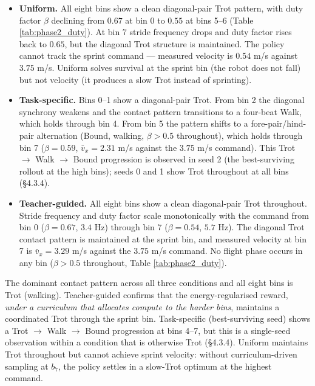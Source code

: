 \begin{itemize}
  \item \textbf{Uniform.} All eight bins show a clean diagonal-pair Trot pattern, with duty factor $\beta$ declining from $0.67$ at bin 0 to $0.55$ at bins 5--6 (Table \ref{tab:phase2_duty}). At bin 7 stride frequency drops and duty factor rises back to $0.65$, but the diagonal Trot structure is maintained. The policy cannot track the sprint command --- measured velocity is $0.54$ m/s against $3.75$ m/s. Uniform solves survival at the sprint bin (the robot does not fall) but not velocity (it produces a slow Trot instead of sprinting).
  \item \textbf{Task-specific.} Bins 0--1 show a diagonal-pair Trot. From bin 2 the diagonal synchrony weakens and the contact pattern transitions to a four-beat Walk, which holds through bin 4. From bin 5 the pattern shifts to a fore-pair/hind-pair alternation (Bound, walking, $\beta > 0.5$ throughout), which holds through bin 7 ($\beta = 0.59$, $\bar v_x = 2.31$ m/s against the $3.75$ m/s command). This Trot $\to$ Walk $\to$ Bound progression is observed in seed 2 (the best-surviving rollout at the high bins); seeds 0 and 1 show Trot throughout at all bins (\S4.3.4).
  \item \textbf{Teacher-guided.} All eight bins show a clean diagonal-pair Trot throughout. Stride frequency and duty factor scale monotonically with the command from bin 0 ($\beta = 0.67$, $3.4$ Hz) through bin 7 ($\beta = 0.54$, $5.7$ Hz). The diagonal Trot contact pattern is maintained at the sprint bin, and measured velocity at bin 7 is $\bar v_x = 3.29$ m/s against the $3.75$ m/s command. No flight phase occurs in any bin ($\beta > 0.5$ throughout, Table \ref{tab:phase2_duty}).
\end{itemize}

The dominant contact pattern across all three conditions and all eight bins is Trot (walking). Teacher-guided confirms that the energy-regularised reward, \textit{under a curriculum that allocates compute to the harder bins}, maintains a coordinated Trot through the sprint bin. Task-specific (best-surviving seed) shows a Trot $\to$ Walk $\to$ Bound progression at bins 4--7, but this is a single-seed observation within a condition that is otherwise Trot (\S4.3.4). Uniform maintains Trot throughout but cannot achieve sprint velocity: without curriculum-driven sampling at $b_7$, the policy settles in a slow-Trot optimum at the highest command.


